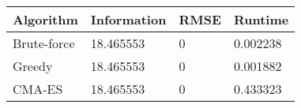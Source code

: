 \begin{tabular}{llll}
\toprule
Algorithm & Information & RMSE & Runtime \\
\midrule
Brute-force & 18.465553 & 0 & 0.002238 \\
Greedy & 18.465553 & 0 & 0.001882 \\
CMA-ES & 18.465553 & 0 & 0.433323 \\
\bottomrule
\end{tabular}

